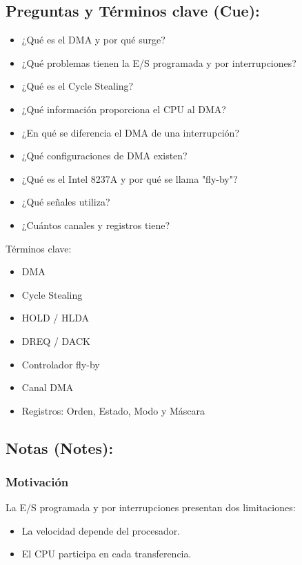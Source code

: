 \documentclass{article}
\begin{document}
\subsection{Preguntas y Términos clave (Cue):}
\label{sec:org49929df}
\begin{itemize}
\item ¿Qué es el DMA y por qué surge?
\item ¿Qué problemas tienen la E/S programada y por interrupciones?
\item ¿Qué es el Cycle Stealing?
\item ¿Qué información proporciona el CPU al DMA?
\item ¿En qué se diferencia el DMA de una interrupción?
\item ¿Qué configuraciones de DMA existen?
\item ¿Qué es el Intel 8237A y por qué se llama "fly-by"?
\item ¿Qué señales utiliza?
\item ¿Cuántos canales y registros tiene?
\end{itemize}

Términos clave:
\begin{itemize}
\item DMA
\item Cycle Stealing
\item HOLD / HLDA
\item DREQ / DACK
\item Controlador fly-by
\item Canal DMA
\item Registros: Orden, Estado, Modo y Máscara
\end{itemize}

\subsection{Notas (Notes):}
\label{sec:org6cdccaf}

\subsubsection{Motivación}
\label{sec:org931b915}
La E/S programada y por interrupciones presentan dos limitaciones:
\begin{itemize}
\item La velocidad depende del procesador.
\item El CPU participa en cada transferencia.
\end{itemize}
\end{document}
